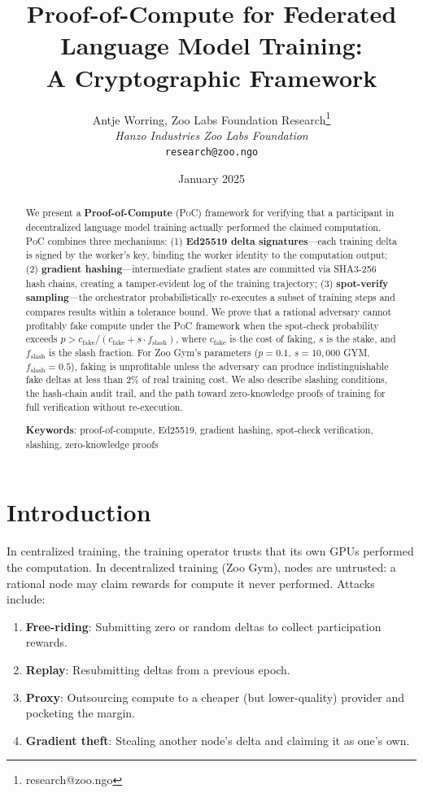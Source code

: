 \documentclass[11pt,letterpaper]{article}
\title{\textbf{Proof-of-Compute for Federated Language Model Training:\\A Cryptographic Framework}}
\author{
Antje Worring, Zoo Labs Foundation Research\thanks{research@zoo.ngo}\\
\textit{Hanzo Industries \quad Zoo Labs Foundation}\\
\texttt{research@zoo.ngo}
}
\date{January 2025}
\newcommand{\PoC}{\textsc{PoC}}
\begin{document}
\zoocoverpage

\begin{abstract}
We present a \textbf{Proof-of-Compute} (\PoC{}) framework for verifying that a participant in decentralized language model training actually performed the claimed computation.  \PoC{} combines three mechanisms: (1) \textbf{Ed25519 delta signatures}---each training delta is signed by the worker's key, binding the worker identity to the computation output; (2) \textbf{gradient hashing}---intermediate gradient states are committed via SHA3-256 hash chains, creating a tamper-evident log of the training trajectory; (3) \textbf{spot-verify sampling}---the orchestrator probabilistically re-executes a subset of training steps and compares results within a tolerance bound.  We prove that a rational adversary cannot profitably fake compute under the \PoC{} framework when the spot-check probability exceeds $p > c_{\text{fake}} / (c_{\text{fake}} + s \cdot f_{\text{slash}})$, where $c_{\text{fake}}$ is the cost of faking, $s$ is the stake, and $f_{\text{slash}}$ is the slash fraction.  For Zoo Gym's parameters ($p = 0.1$, $s = 10{,}000$ GYM, $f_{\text{slash}} = 0.5$), faking is unprofitable unless the adversary can produce indistinguishable fake deltas at less than 2\% of real training cost.  We also describe slashing conditions, the hash-chain audit trail, and the path toward zero-knowledge proofs of training for full verification without re-execution.

\textbf{Keywords}: proof-of-compute, Ed25519, gradient hashing, spot-check verification, slashing, zero-knowledge proofs
\end{abstract}

\section{Introduction}

In centralized training, the training operator trusts that its own GPUs performed the computation.  In decentralized training (Zoo Gym), nodes are untrusted: a rational node may claim rewards for compute it never performed.  Attacks include:

\begin{enumerate}
    \item \textbf{Free-riding}: Submitting zero or random deltas to collect participation rewards.
    \item \textbf{Replay}: Resubmitting deltas from a previous epoch.
    \item \textbf{Proxy}: Outsourcing compute to a cheaper (but lower-quality) provider and pocketing the margin.
    \item \textbf{Gradient theft}: Stealing another node's delta and claiming it as one's own.
\end{enumerate}
\end{document}
